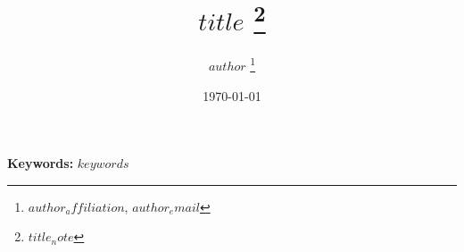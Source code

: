 \begin{titlepage}
\title{
    $title$
    \thanks{$title_note$}
    }
\author{
    $author$ \thanks{$author_affiliation$, \href{mailto:$author_email$}{$author_email$}}
    } 
\date{\today}

\maketitle



\noindent\textbf{Keywords:} $keywords$ 


\setcounter{page}{0}
\thispagestyle{empty}
\end{titlepage}

